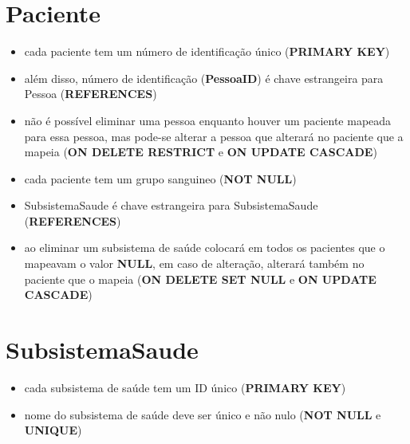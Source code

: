 \documentclass[article, a4paper, 12pt, oneside]{memoir}
\begin{document}
\section*{Paciente}
\begin{itemize}
	\item cada paciente tem um número de identificação único (\textbf{PRIMARY KEY})
	\item além disso, número de identificação (\textbf{PessoaID}) é chave estrangeira para Pessoa (\textbf{REFERENCES})
	\item não é possível eliminar uma pessoa enquanto houver um paciente mapeada para essa pessoa, mas pode-se alterar a pessoa que alterará no paciente que a mapeia (\textbf{ON DELETE RESTRICT} e \textbf{ON UPDATE CASCADE})
	\item cada paciente tem um grupo sanguineo (\textbf{NOT NULL})
	\item SubsistemaSaude é chave estrangeira para SubsistemaSaude (\textbf{REFERENCES})
	\item ao eliminar um subsistema de saúde colocará em todos os pacientes que o mapeavam o valor \textbf{NULL}, em caso de alteração, alterará também no paciente que o mapeia (\textbf{ON DELETE SET NULL} e \textbf{ON UPDATE CASCADE})
\end{itemize}

\section*{SubsistemaSaude}
\begin{itemize}
	\item cada subsistema de saúde tem um ID único (\textbf{PRIMARY KEY})
	\item nome do subsistema de saúde deve ser único e não nulo (\textbf{NOT NULL} e \textbf{UNIQUE})
\end{itemize}
\end{document}
